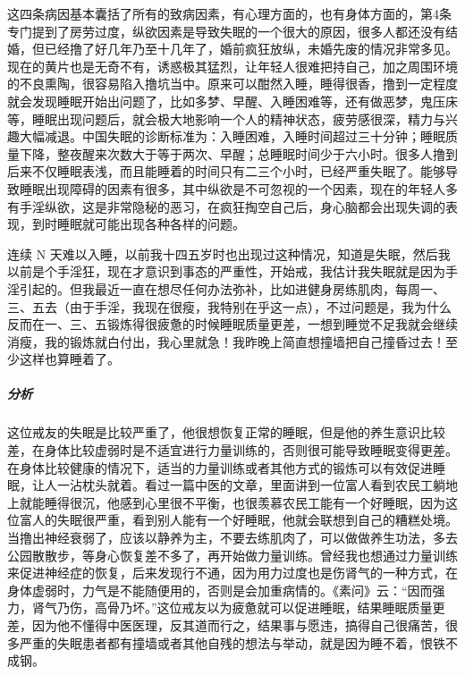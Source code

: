 这四条病因基本囊括了所有的致病因素，有心理方面的，也有身体方面的，第4条专门提到了房劳过度，纵欲因素是导致失眠的一个很大的原因，很多人都还没有结婚，但已经撸了好几年乃至十几年了，婚前疯狂放纵，未婚先废的情况非常多见。现在的黄片也是无奇不有，诱惑极其猛烈，让年轻人很难把持自己，加之周围环境的不良熏陶，很容易陷入撸坑当中。原来可以酣然入睡，睡得很香，撸到一定程度就会发现睡眠开始出问题了，比如多梦、早醒、入睡困难等，还有做恶梦，鬼压床等，睡眠出现问题后，就会极大地影响一个人的精神状态，疲劳感很深，精力与兴趣大幅减退。中国失眠的诊断标准为：入睡困难，入睡时间超过三十分钟；睡眠质量下降，整夜醒来次数大于等于两次、早醒；总睡眠时间少于六小时。很多人撸到后来不仅睡眠表浅，而且能睡着的时间只有二三个小时，已经严重失眠了。能够导致睡眠出现障碍的因素有很多，其中纵欲是不可忽视的一个因素，现在的年轻人多有手淫纵欲，这是非常隐秘的恶习，在疯狂掏空自己后，身心脑都会出现失调的表现，到时睡眠就可能出现各种各样的问题。

\begin{case}
    连续 N 天难以入睡，以前我十四五岁时也出现过这种情况，知道是失眠，然后我以前是个手淫狂，现在才意识到事态的严重性，开始戒，我估计我失眠就是因为手淫引起的。但我最近一直在想尽任何办法弥补，比如进健身房练肌肉，每周一、三、五去（由于手淫，我现在很瘦，我特别在乎这一点），不过问题是，我为什么反而在一、三、五锻炼得很疲惫的时候睡眠质量更差，一想到睡觉不足我就会继续消瘦，我的锻炼就白付出，我心里就急！我昨晚上简直想撞墙把自己撞昏过去！至少这样也算睡着了。
    \subparagraph{分析} 这位戒友的失眠是比较严重了，他很想恢复正常的睡眠，但是他的养生意识比较差，在身体比较虚弱时是不适宜进行力量训练的，否则很可能导致睡眠变得更差。在身体比较健康的情况下，适当的力量训练或者其他方式的锻炼可以有效促进睡眠，让人一沾枕头就着。看过一篇中医的文章，里面讲到一位富人看到农民工躺地上就能睡得很沉，他感到心里很不平衡，也很羡慕农民工能有一个好睡眠，因为这位富人的失眠很严重，看到别人能有一个好睡眠，他就会联想到自己的糟糕处境。当撸出神经衰弱了，应该以静养为主，不要去练肌肉了，可以做做养生功法，多去公园散散步，等身心恢复差不多了，再开始做力量训练。曾经我也想通过力量训练来促进神经症的恢复，后来发现行不通，因为用力过度也是伤肾气的一种方式，在身体虚弱时，力气是不能随便用的，否则是会加重病情的。《素问》云：“因而强力，肾气乃伤，高骨乃坏。”这位戒友以为疲惫就可以促进睡眠，结果睡眠质量更差，因为他不懂得中医医理，反其道而行之，结果事与愿违，搞得自己很痛苦，很多严重的失眠患者都有撞墙或者其他自残的想法与举动，就是因为睡不着，恨铁不成钢。
\end{case}

